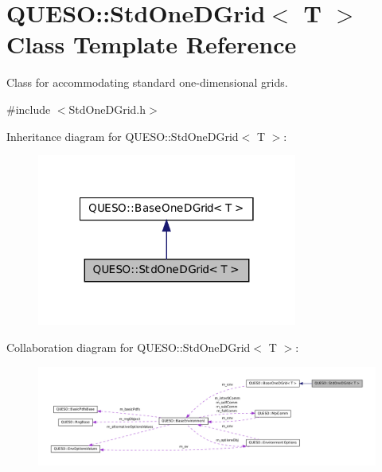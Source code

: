 \hypertarget{class_q_u_e_s_o_1_1_std_one_d_grid}{\section{Q\-U\-E\-S\-O\-:\-:Std\-One\-D\-Grid$<$ T $>$ Class Template Reference}
\label{class_q_u_e_s_o_1_1_std_one_d_grid}
}


Class for accommodating standard one-\/dimensional grids.  




{\ttfamily \#include $<$Std\-One\-D\-Grid.\-h$>$}



Inheritance diagram for Q\-U\-E\-S\-O\-:\-:Std\-One\-D\-Grid$<$ T $>$\-:
\nopagebreak
\begin{figure}[H]
\begin{center}
\leavevmode
\includegraphics[width=242pt]{class_q_u_e_s_o_1_1_std_one_d_grid__inherit__graph}
\end{center}
\end{figure}


Collaboration diagram for Q\-U\-E\-S\-O\-:\-:Std\-One\-D\-Grid$<$ T $>$\-:
\nopagebreak
\begin{figure}[H]
\begin{center}
\leavevmode
\includegraphics[width=350pt]{class_q_u_e_s_o_1_1_std_one_d_grid__coll__graph}
\end{center}
\end{figure}
